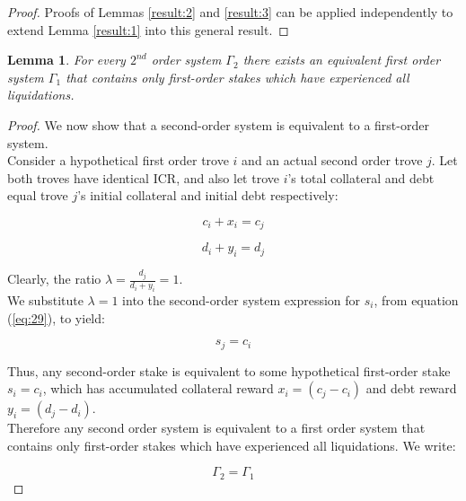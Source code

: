 \documentclass[reqno]{article}
\newtheorem{lemma}[theorem]{Lemma}
\begin{document}
\begin{proof}
  Proofs of Lemmas \ref{result:2} and \ref{result:3} can be applied independently to extend Lemma \ref{result:1} into this general result.
\end{proof}

\begin{lemma} \label{result:5}
  For every $2^{nd}$ order system $\Gamma_2$ there exists an equivalent first order system $\Gamma_1$ that contains only first-order stakes which have experienced all liquidations.
\end{lemma}

\begin{proof}
We now show that a second-order system is equivalent to a first-order system.\\

Consider a hypothetical first order trove $i$ and an actual second order trove $j$. Let both troves have identical ICR, and also let trove $i$’s total collateral and debt equal trove $j$’s initial collateral and initial debt respectively:

\begin{equation} 
    c_i+x_i=c_j
\end{equation}

\begin{equation} 
    d_i+y_i=d_j
\end{equation}

\bigskip
Clearly, the ratio  $\lambda = \frac{d_j}{d_i+y_i} = 1$.\\

We substitute $\lambda=1$ into the second-order system expression for $s_i$, from equation (\ref{eq:29}), to yield:

\begin{equation} 
    s_j=c_i
\end{equation}

\bigskip
Thus, any second-order stake is equivalent to some hypothetical first-order stake $s_i=c_i$, which has accumulated collateral reward $x_i=(c_j-c_i)$ and debt reward $y_i=(d_j-d_i)$.\\

Therefore any second order system is equivalent to a first order system that contains only first-order stakes which have experienced all liquidations. We write:

\begin{equation} 
    \Gamma_2=\Gamma_1
\end{equation}
\end{proof}
\end{document}
